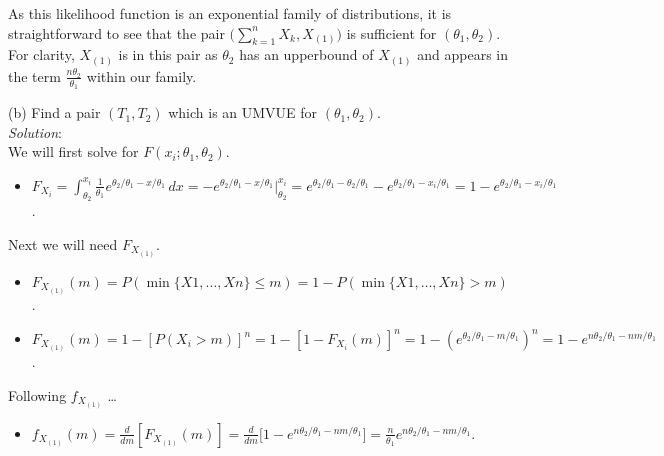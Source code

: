 \documentclass[12pt]{article}
\newcommand{\ds}{\displaystyle}
\begin{document}
As this likelihood function is an exponential family of distributions, it is straightforward to see that the pair $ \ds \bigl( \sum_{k=1}^{n} X_{k} , X_{(1)} \bigr) $ is sufficient for $ (\theta_{1}, \theta_{2}) $. \\

For clarity, $ X_{(1)} $ is in this pair as $ \theta_{2} $ has an upperbound of $ X_{(1)} $ and appears in the term $ \ds \frac{n\theta_{2}}{\theta_{1}} $ within our family. \\

\vspace{2.5mm}
\newpage

(b) Find a pair $ (T_{1}, T_{2}) $ which is an UMVUE for $ (\theta_{1}, \theta_{2}) $.
\vspace{2.5mm} \\
\textit{Solution}:
\vspace{2.5mm} \\

\noindent
We will first solve for $ F( x_{i}; \theta_{1}, \theta_{2} ) $.

\begin{itemize}
    \item $ \ds F_{X_{i}} = \int_{\theta_{2}}^{x_{i}} \frac{1}{\theta_{1}}e^{\theta_{2} / \theta_{1} - x / \theta_{1}} \,dx = -e^{\theta_{2} / \theta_{1} - x / \theta_{1}} \Big|_{\theta_{2}}^{x_{i}} = e^{\theta_{2} / \theta_{1} - \theta_{2} / \theta_{1}} -e^{\theta_{2} / \theta_{1} - x_{i} / \theta_{1}} = 1 - e^{\theta_{2} / \theta_{1} - x_{i} / \theta_{1}} $.
\end{itemize}

\noindent
Next we will need $ F_{X_{(1)}} $.

\begin{itemize}
    \item $ \ds F_{X_{(1)}}(m) = P(\min\{ X{1}, \dots, X{n} \} \le m) = 1 - P(\min\{ X{1}, \dots, X{n} \} > m) $.
    \item $ \ds F_{X_{(1)}}(m) = 1 - [ P(X_{i} > m)]^{n} = 1 - [ 1 - F_{X_{i}}(m) ]^{n} =  1 - (e^{\theta_{2} / \theta_{1} - m / \theta_{1}})^{n} =  1 - e^{n\theta_{2} / \theta_{1} - nm / \theta_{1}} $.
\end{itemize}

\noindent
Following $ f_{X_{(1)}} $ \dots

\begin{itemize}
    \item $ \ds f_{X_{(1)}}(m) = \frac{d}{dm} [ F_{X_{(1)}}(m) ] = \frac{d}{dm} \bigl[ 1 - e^{n\theta_{2} / \theta_{1} - nm / \theta_{1}} \bigr] = \frac{n}{\theta_{1}}e^{n\theta_{2} / \theta_{1} - nm / \theta_{1}}  $.
\end{itemize}
\end{document}
